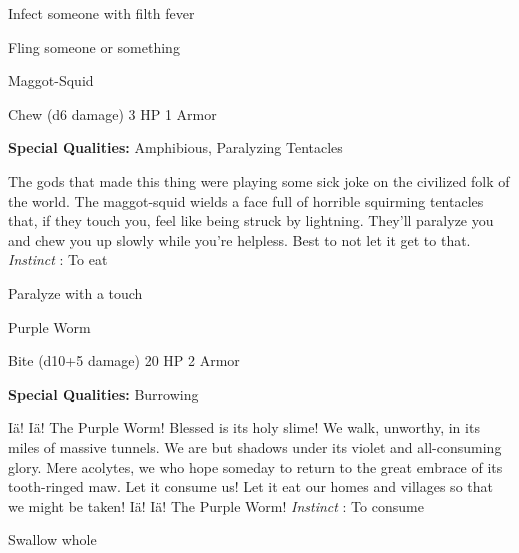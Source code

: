 \startitemize[1,packed]
         
\item Infect someone with filth fever

         
\item Fling someone or something

       
\stopitemize
       
\startMonsterName
Maggot-Squid	 
\stopMonsterName
       

Chew (d6 damage)	3 HP	1 Armor

       


       
\startMonsterQualities
         {\bf Special Qualities:}  Amphibious, Paralyzing Tentacles
\stopMonsterQualities
       
\startMonsterDescription
The gods that made this thing were playing some sick joke on the civilized folk of the world. The maggot-squid wields a face full of horrible squirming tentacles that, if they touch you, feel like being struck by lightning. They’ll paralyze you and chew you up slowly while you’re helpless. Best to not let it get to that. {\em Instinct} : To eat
\stopMonsterDescription
       
\startitemize[1,packed]
         
\item Paralyze with a touch

       
\stopitemize
       
\startMonsterName
Purple Worm	 
\stopMonsterName
       

Bite (d10+5 damage)	20 HP	2 Armor

       


       
\startMonsterQualities
         {\bf Special Qualities:}  Burrowing
\stopMonsterQualities
       
\startMonsterDescription
Iä! Iä! The Purple Worm! Blessed is its holy slime! We walk, unworthy, in its miles of massive tunnels. We are but shadows under its violet and all-consuming glory. Mere acolytes, we who hope someday to return to the great embrace of its tooth-ringed maw. Let it consume us! Let it eat our homes and villages so that we might be taken! Iä! Iä! The Purple Worm! {\em Instinct} : To consume
\stopMonsterDescription
       
\startitemize[1,packed]
         
\item Swallow whole

